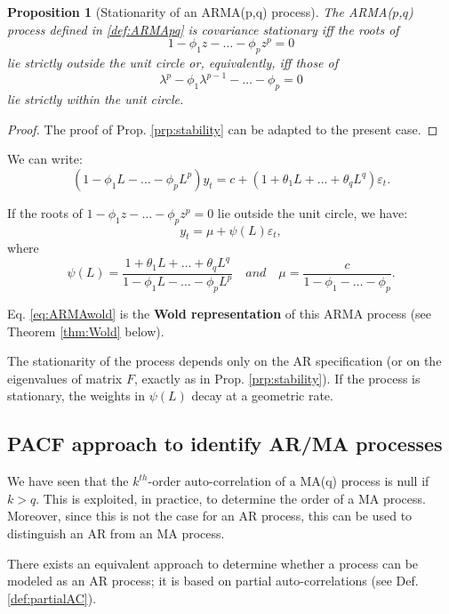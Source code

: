 \documentclass[
  12pt,
]{book}
\newtheorem{proposition}{Proposition}[chapter]
\theoremstyle{definition}
\theoremstyle{definition}
\theoremstyle{definition}
\theoremstyle{definition}
\theoremstyle{remark}
\begin{document}
\begin{proposition}[Stationarity of an ARMA(p,q) process]
\protect\hypertarget{prp:statioARMApq}{}\label{prp:statioARMApq}The ARMA(\(p\),\(q\)) process defined in \ref{def:ARMApq} is covariance stationary iff the roots of
\[
1 - \phi_1 z - \dots - \phi_p z^p=0
\]
lie strictly outside the unit circle or, equivalently, iff those of
\[
\lambda^p - \phi_1 \lambda^{p-1} - \dots - \phi_p=0
\]
lie strictly within the unit circle.
\end{proposition}

\begin{proof}
The proof of Prop. \ref{prp:stability} can be adapted to the present case.
\end{proof}

We can write:
\[
(1 - \phi_1 L - \dots - \phi_p L^p)y_t = c + (1 + \theta_1 L + \dots + \theta_q L^q)\varepsilon_t.
\]

If the roots of \(1 - \phi_1 z - \dots - \phi_p z^p=0\) lie outside the unit circle, we have:
\begin{equation}
y_t = \mu + \psi(L)\varepsilon_t,\label{eq:ARMAwold}
\end{equation}
where
\[
\psi(L) = \frac{1 + \theta_1 L + \dots + \theta_q L^q}{1 - \phi_1 L - \dots - \phi_p L^p} \quad and \quad \mu = \dfrac{c}{1-\phi_1 -\dots - \phi_p}.
\]

Eq. \eqref{eq:ARMAwold} is the \textbf{Wold representation} of this ARMA process (see Theorem \ref{thm:Wold} below).

The stationarity of the process depends only on the AR specification (or on the eigenvalues of matrix \(F\), exactly as in Prop. \ref{prp:stability}). If the process is stationary, the weights in \(\psi(L)\) decay at a geometric rate.

\hypertarget{PACFapproach}{%
\subsection{PACF approach to identify AR/MA processes}\label{PACFapproach}}

We have seen that the \(k^{th}\)-order auto-correlation of a MA(q) process is null if \(k>q\). This is exploited, in practice, to determine the order of a MA process. Moreover, since this is not the case for an AR process, this can be used to distinguish an AR from an MA process.

There exists an equivalent approach to determine whether a process can be modeled as an AR process; it is based on partial auto-correlations (see Def. \ref{def:partialAC}).
\end{document}
